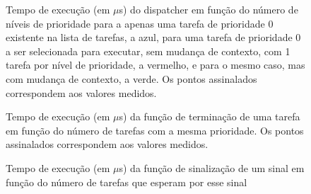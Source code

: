 \documentclass[journal]{IEEEtran}
\begin{document}
\begin{figure}
	\centering
	\resizebox{0.5\textwidth}{!}{\large }
	\caption{Tempo de execução (em $\mu$s) do dispatcher em função do número de níveis de prioridade para a apenas uma tarefa de prioridade 0 existente na lista de tarefas, a azul,
	para uma tarefa de prioridade 0 a ser selecionada para executar, sem mudança de contexto, com 1 tarefa por nível de prioridade, a vermelho, e para o mesmo caso, mas
	com mudança de contexto, a verde. Os pontos assinalados correspondem aos valores medidos.}
	\label{fig:disp}
\end{figure}

\begin{figure}
	\centering
	\resizebox{0.5\textwidth}{!}{\large }
	\caption{Tempo de execução (em $\mu$s) da função de terminação de uma tarefa em função do número de tarefas com a mesma prioridade. Os pontos assinalados correspondem aos valores
	medidos.}
	\label{fig:term}
\end{figure}

\begin{figure}
	\centering
	\resizebox{0.5\textwidth}{!}{\large }
	\caption{Tempo de execução (em $\mu$s) da função de sinalização de um sinal em função do número de tarefas que esperam por esse sinal}
	\label{fig:sin}
\end{figure}
\end{document}
